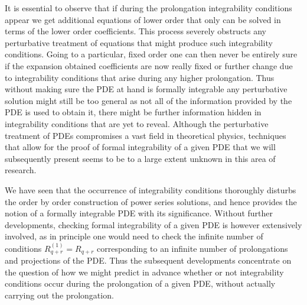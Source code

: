 \documentclass[a4paper,12pt, DIV=14, BCOR=5mm, twoside, headsepline, numbers=noenddot]{scrbook}
\begin{document}
It is essential to observe that if during the prolongation integrability conditions appear we get additional equations of lower order that only can be solved in terms of the lower order coefficients. This process severely obstructs any perturbative treatment of equations that might produce such integrability conditions. Going to a particular, fixed order one can then never be entirely sure if the expansion obtained coefficients are now really fixed or further change due to integrability conditions that arise during any higher prolongation.  Thus without making sure the PDE at hand is formally integrable any perturbative solution might still be too general as not all of the information provided by the PDE is used to obtain it, there might be further information hidden in integrability conditions that are yet to reveal. Although the perturbative treatment of PDEs compromises a vast field in theoretical physics, techniques that allow for the proof of formal integrability of a given PDE that we will subsequently present seems to be to a large extent unknown in this area of research. 

We have seen that the occurrence of integrability conditions thoroughly disturbs the order by order construction of power series solutions, and hence provides the notion of a formally integrable PDE with its significance. Without further developments, checking formal integrability of a given PDE is however extensively involved, as in principle one would need to check the infinite number of conditions $R_{q+r}^{(1)} = R_{q+r}$ corresponding to an infinite number of prolongations and projections of the PDE. Thus the subsequent developments concentrate on the question of how we might predict in advance whether or not integrability conditions occur during the prolongation of a given PDE, without actually carrying out the prolongation.
\end{document}

